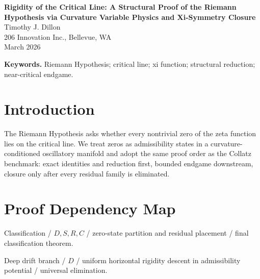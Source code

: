\documentclass[11pt]{article}
\theoremstyle{definition}
\begin{document}
\begin{center}
{\LARGE \textbf{Rigidity of the Critical Line: A Structural Proof of the Riemann Hypothesis via Curvature Variable Physics and Xi-Symmetry Closure}}\\[0.85em]
{\large Timothy J. Dillon}\\
206 Innovation Inc., Bellevue, WA\\
March 2026
\end{center}

\begin{abstract}
We study the nontrivial zeros of the Riemann zeta function through a structural reformulation in which the critical line $\Re(s)=\tfrac12$ is the unique Rigidity Axis compatible with admissible oscillatory balance. We present a reduction-and-closure proof of the Riemann Hypothesis based on symmetry-axis localization, persistence-leak exclusion, off-line instability elimination, bounded near-critical candidate reduction, and final incompatibility of all residual off-line templates. The full argument reduces hypothetical off-line behavior to deep, segment-critical, shallow-return, and near-critical families, then eliminates each family in turn. Consequently every nontrivial zero lies on the critical line. Therefore the Riemann Hypothesis holds.
\end{abstract}

\noindent\textbf{Keywords.} Riemann Hypothesis; critical line; xi function; structural reduction; near-critical endgame.

\section{Introduction}
The Riemann Hypothesis asks whether every nontrivial zero of the zeta function lies on the critical line. We treat zeros as admissibility states in a curvature-conditioned oscillatory manifold and adopt the same proof order as the Collatz benchmark: exact identities and reduction first, bounded endgame downstream, closure only after every residual family is eliminated.
\section{Proof Dependency Map}
Classification / $D,S,R,C$ / zero-state partition and residual placement / final classification theorem.

Deep drift branch / $D$ / uniform horizontal rigidity descent in admissibility potential / universal elimination.
\end{document}
